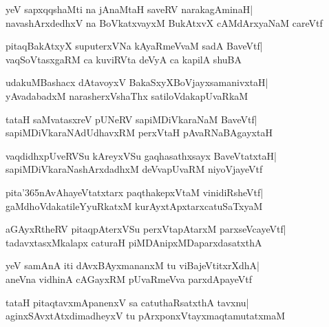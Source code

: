 \documentclass[twoside,12pt,openright]{book}
\newcounter{shloka}[chapter]
\begin{document}
\begin{shloka}%
yeV sapxqqshaMti na jAnaMtaH saveRV narakagAminaH|\\
navashArxdedhxV na BoVkatxvayxM BukAtxvX cAMdArxyaNaM careVtf
\end{shloka}

\begin{shloka}%
pitaqBakAtxyX suputerxVNa kAyaRmeVvaM sadA BaveVtf|\\
vaqSoVtasxgaRM ca kuviRVta deVyA ca kapilA shuBA
\end{shloka}

\begin{shloka}%
udakuMBashacx dAtavoyxV BakaSxyXBoVjayxsamanivxtaH|\\
yAvadabadxM narasherxVshaThx satiloVdakapUvaRkaM
\end{shloka}

\begin{shloka}%
tataH saMvatasxreV pUNeRV sapiMDiVkaraNaM BaveVtf|\\
sapiMDiVkaraNAdUdhavxRM perxVtaH pAvaRNaBAgayxtaH
\end{shloka}

\begin{shloka}%
vaqdidhxpUveRVSu kAreyxVSu gaqhasathxsayx BaveVtatxtaH|\\
sapiMDiVkaraNashArxdadhxM deVvapUvaRM niyoVjayeVtf
\end{shloka}

\begin{shloka}%
pita\char'365nAvAhayeVtatxtarx paqthakepxVtaM vinidiRsheVtf|\\
gaMdhoVdakatileYyuRkatxM kurAyxtApxtarxcatuSaTxyaM
\end{shloka}

\begin{shloka}%
aGAyxRtheRV pitaqpAterxVSu perxVtapAtarxM parxseVcayeVtf|\\
tadavxtasxMkalapx caturaH piMDAnipxMDaparxdasatxthA
\end{shloka}

\begin{shloka}%
yeV samAnA iti dAvxBAyxmananxM tu viBajeVtitxrXdhA|\\
aneVna vidhinA cAGayxRM pUvaRmeVva parxdApayeVtf
\end{shloka}

\begin{shloka}%
tataH pitaqtavxmApanenxV sa catuthaRsatxthA tavxnu|\\
aginxSAvxtAtxdimadheyxV tu pArxponxVtayxmaqtamutatxmaM
\end{shloka}
\end{document}
